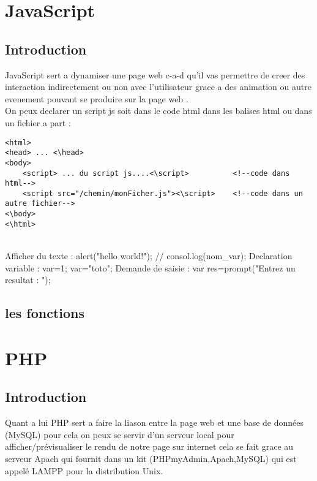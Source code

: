 \documentclass[a4paper,12pt]{book}
\begin{document}

\chapter{JavaScript}

\section{Introduction}

JavaScript sert a dynamiser une page web c-a-d qu'il vas permettre de creer des interaction indirectement ou non avec l'utilisateur grace a des animation ou autre evenement pouvant se produire sur la page web .\\
On peux declarer un script js soit dans le code html dans les balises html ou dans un fichier a part : 
\begin{DDbox}{\linewidth}
\begin{lstlisting}
<html>
<head> ... <\head>
<body>
	<script> ... du script js....<\script> 			<!--code dans html-->
	<script src="/chemin/monFicher.js"><\script>    <!--code dans un  autre fichier-->
<\body>
<\html>
\end{lstlisting}
\end{DDbox}{\linewidth}
\\
Afficher du texte : 	alert("hello world!"); // consol.log(nom_var);
Declaration variable :  var=1; var="toto";
Demande de  saisie : 	var res=prompt("Entrez un resultat : ");
\\
\section{les fonctions}





\chapter{PHP}

\section{Introduction}

Quant a lui PHP sert a faire la liason entre la page web et une base de données (MySQL) pour cela on peux se servir d'un serveur local pour afficher/prévisualiser le rendu de notre page sur internet cela se fait grace au serveur Apach qui fournit dans un kit (PHPmyAdmin,Apach,MySQL) qui est appelé LAMPP pour la distribution Unix.
\\
\end{document}
